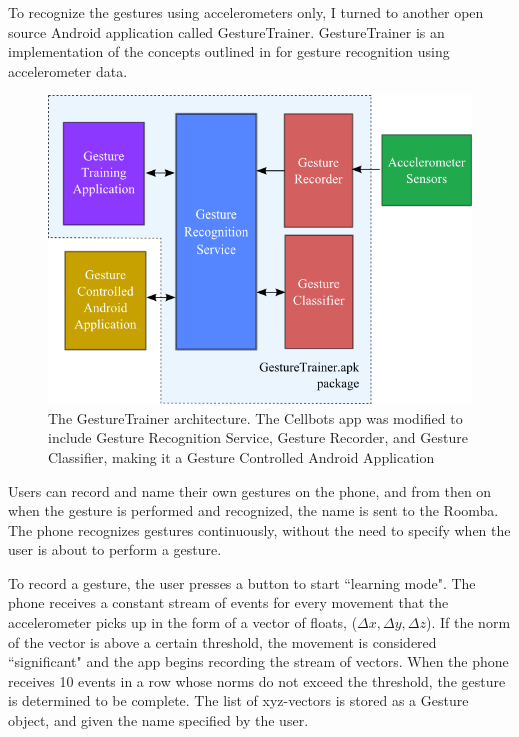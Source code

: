 \documentclass[12pt, letterpaper]{report}
\begin{document}
To recognize the gestures using accelerometers only, I turned to another open source Android application called GestureTrainer. GestureTrainer is an implementation of the concepts outlined in \cite{TaKG} for gesture recognition using accelerometer data.

\begin{figure}[h]
	\centering
	\includegraphics[width=\textwidth]{images/gesture_framework}
	\caption{The GestureTrainer architecture. The Cellbots app was modified to include Gesture Recognition Service, Gesture Recorder, and Gesture Classifier, making it a Gesture Controlled Android Application}
	\label{gesture_framework}
\end{figure}

Users can record and name their own gestures on the phone, and from then on when the gesture is performed and recognized, the name is sent to the Roomba. The phone recognizes gestures continuously, without the need to specify when the user is about to perform a gesture.

To record a gesture, the user presses a button to start ``learning mode". The phone receives a constant stream of events for every movement that the accelerometer picks up in the form of a vector of floats, ($\Delta x, \Delta y, \Delta z$). If the norm of the vector is above a certain threshold, the movement is considered ``significant" and the app begins recording the stream of vectors. When the phone receives 10 events in a row whose norms do not exceed the threshold, the gesture is determined to be complete. The list of xyz-vectors is stored as a Gesture object, and given the name specified by the user. 
\end{document}
